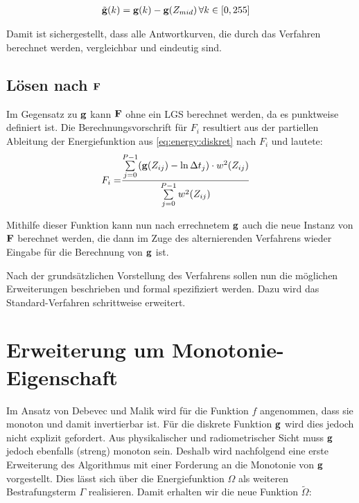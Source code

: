 \begin{align}
\tilde{\mathbf g}(k) &= \mathbf g(k)-\mathbf g(Z_{mid})\, \forall k \in [0,255]
\end{align}

Damit ist sichergestellt, dass alle Antwortkurven, die durch das Verfahren berechnet werden, vergleichbar und eindeutig sind.



\subsection{Lösen nach $\mathbf F$}
Im Gegensatz zu $\mathbf g$ kann $\mathbf F$ ohne ein \gls{LGS} berechnet werden, da es punktweise definiert ist. Die Berechnungsvorschrift für $F_i$ resultiert aus der partiellen Ableitung der Energiefunktion aus \autoref{eq:energy:diskret} nach $F_i$ und lautete:
\begin{align}
\label{eq:fi:basic}
    F_i =& \frac{\sum \limits_{j=0}^{P-1} (\mathbf g(Z_{ij})-\ln \Delta t_j)\cdot w^2(Z_{ij})}{\sum \limits_{j=0}^{P-1} w^2(Z_{ij})}
\end{align}

Mithilfe dieser Funktion kann nun nach errechnetem $\mathbf g$ auch die neue Instanz von $\mathbf F$ berechnet werden, die dann im Zuge des alternierenden Verfahrens wieder Eingabe für die Berechnung von $\mathbf g$ ist.


Nach der grundsätzlichen Vorstellung des Verfahrens sollen nun die möglichen Erweiterungen beschrieben und formal spezifiziert werden. Dazu wird das Standard-Verfahren schrittweise erweitert.


\section{Erweiterung um Monotonie-Eigenschaft}
\label{sec:monotonie}

Im Ansatz von Debevec und Malik wird für die Funktion $f$ angenommen, dass sie monoton und damit invertierbar ist. Für die diskrete Funktion $\mathbf g$ wird dies jedoch nicht explizit gefordert. Aus physikalischer und radiometrischer Sicht muss $\mathbf g$ jedoch ebenfalls (streng) monoton sein. Deshalb wird nachfolgend eine erste Erweiterung des Algorithmus mit einer Forderung an die Monotonie von $\mathbf g$ vorgestellt. Dies lässt sich über die Energiefunktion $\Omega$ als weiteren Bestrafungsterm $\Gamma$ realisieren. Damit erhalten wir die neue Funktion $\tilde{\Omega}$: 

